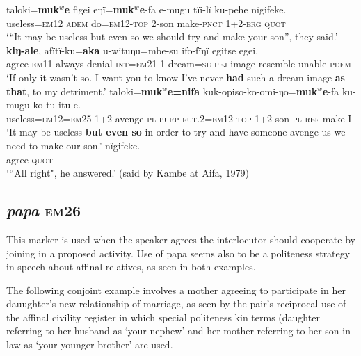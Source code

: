 \documentclass[output=paper]{langsci/langscibook}
\begin{document}
\begin{exe}
\ex \label{ex:eb63}
	\begin{xlist}
	\ex \label{ex:eb63a}
	\gll taloki=\textbf{muk$^w$e} figei eŋï=\textbf{muk$^w$e}-fa e-mugu tïi-lï ku-pehe nïgifeke.\\
	useless=\textsc{em12} \textsc{adem} do=\textsc{em12-top} 2-son make-\textsc{pnct} 1+2-\textsc{erg} \textsc{quot}\\
	\trans `“It may be useless but even so we should try and make your son”, they said.’
	\ex \label{ex:eb63b}
	 \textbf{kiŋ-ale}, afïtï-ku=\textbf{aka} u-wituŋu=mbe-su ifo-fïŋï egitse egei.\\
	agree \textsc{em11}-always denial-\textsc{int=em21} 1-dream=\textsc{se-pej} image-resemble unable \textsc{pdem}\\
	\trans ‘If only it wasn’t so.  I want you to know I’ve never \textbf{had} such a dream image \textbf{as that}, to my detriment.’
	\ex \label{ex:eb63c}
	\gll taloki=\textbf{muk$^w$e=nifa} kuk-opiso-ko-omi-ŋo=\textbf{muk$^w$e}-fa ku-mugu-ko tu-itu-e.\\
	useless=\textsc{em12=em25} 1+2-avenge-\textsc{pl-purp-fut.2=em12-top} 1+2-son-\textsc{pl} \textsc{ref}-make-I\\
	\trans ‘It may be useless \textbf{but even so} in order to try and have someone avenge us we need to make our son.’
	\ex \label{ex:eb63d}
	 nïgifeke.\\
	agree \textsc{quot}\\
	\trans `“All right", he answered.' (said by Kambe at Aifa, 1979)
\end{xlist}
\end{exe}

\subsection{\textit{papa} \textsc{em}26} 
This marker is used when the speaker agrees the interlocutor should cooperate by joining in a proposed activity.  Use of papa seems also to be a politeness strategy in speech about affinal relatives,   as seen in both examples. 

The following conjoint example involves a mother agreeing to participate in her dauughter’s  new relationship of marriage, as seen by the pair’s reciprocal use of the affinal civility register in which special politeness kin terms (daughter referring to her husband as ‘your nephew’ and her mother referring to her son-in-law as ‘your younger brother’  are used.
\end{document}

